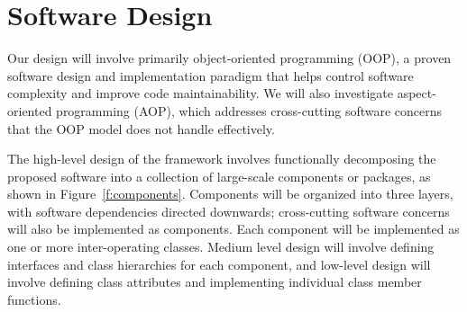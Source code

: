 \documentclass[11pt,letterpaper]{article}
\begin{document}
\section{Software Design} \label{s:design}


Our design will involve primarily object-oriented programming (OOP), a
proven software design and implementation paradigm that helps control
software complexity and improve code maintainability.  We
will also investigate aspect-oriented programming (AOP),
which addresses cross-cutting software concerns that the OOP model does
not handle effectively.

The high-level design of the framework involves functionally decomposing
the proposed software into a collection of large-scale components or
packages, as shown in Figure~\ref{f:components}.
Components will be organized into three layers, with
software dependencies directed downwards; cross-cutting software
concerns will also be implemented as components.  Each component will
be implemented as one or more inter-operating classes.  Medium level
design will involve defining interfaces and class hierarchies for each
component, and low-level design will involve defining class attributes
and implementing individual class member functions.



\end{document}
